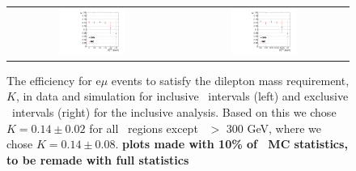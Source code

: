 \begin{figure}[!ht]
\begin{center}
\begin{tabular}{cc}
\includegraphics[width=0.4\textwidth]{plots/K_incl.pdf} &
\includegraphics[width=0.4\textwidth]{plots/K_excl.pdf} \\
\end{tabular}
\caption{
The efficiency for e$\mu$ events to satisfy the dilepton mass requirement, $K$, in data and simulation for inclusive \MET\ intervals (left) and
exclusive \MET\ intervals (right) for the inclusive analysis. Based on this we chose $K=0.14\pm0.02$ for all \MET\ regions except \MET\ $>$ 300 GeV,
where we chose $K=0.14\pm0.08$.
{\bf plots made with 10\% of \zjets\ MC statistics, to be remade with full statistics}
\label{fig:K_incl}
}
\end{center}
\end{figure}

